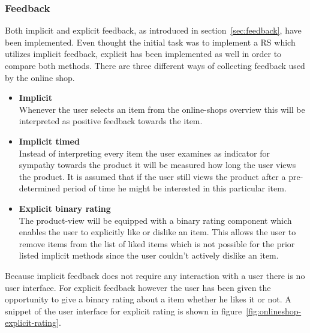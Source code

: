 \subsubsection{Feedback}
\label{sec:onlineshop-feedback}
Both implicit and explicit feedback, as introduced in section~\ref{sec:feedback}, have been implemented.
Even thought the initial task was to implement a RS which utilizes implicit feedback, explicit has been implemented as well in order to compare both methods.
There are three different ways of collecting feedback used by the online shop.
\begin{itemize}
    \item \textbf{Implicit}\hfill\\
        Whenever the user selects an item from the online-shops overview this will be interpreted as positive feedback towards the item.
    \item \textbf{Implicit timed}\hfill\\
        Instead of interpreting every item the user examines as indicator for sympathy towards the product it will be measured how long the user views the product.
        It is assumed that if the user still views the product after a pre-determined period of time he might be interested in this particular item.
    \item \textbf{Explicit binary rating}\\
        The product-view will be equipped  with a binary rating component which enables the user to explicitly like or dislike an item.
        This allows the user to remove items from the list of liked items which is not possible for the prior listed implicit methods since the user couldn't actively dislike an item.
\end{itemize}

Because implicit feedback does not require any interaction with a user there is no user interface.
For explicit feedback however the user has been given the opportunity to give a binary rating about a item whether he likes it or not.
A snippet of the user interface for explicit rating is shown in figure~\ref{fig:onlineshop-explicit-rating}.

